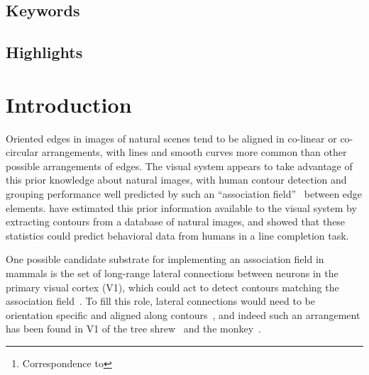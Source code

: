 \documentclass{article}%
\title{\Title}%
\author{\AuthorA \thanks{Correspondence to \Email}}%
\affil{\AddressA}
\author{\AuthorB }
\affil{\AddressB}
\date{}
\begin{document}
%
\maketitle%
{\bf %
\begin{quote}
%
\Abstract
\end{quote}
}%
%
\subsection*{Keywords}%
\Keywords%
%
\subsection*{Highlights}%
\noindent\Highlights %
\section*{Introduction}%
Oriented edges in images of natural scenes tend to be aligned in co-linear or co-circular arrangements, 
with lines and smooth curves more common than other possible arrangements of edges. 
The visual system appears to take advantage of this prior knowledge about natural images, 
with human contour detection and grouping performance well predicted 
by such an ``association field''~\citep{Field93} between edge elements. 
\citet{Geisler01} have estimated this prior information available
to the visual system by extracting contours from a database of natural
images, and showed that these statistics could predict behavioral data
from humans in a line completion task.

One possible candidate substrate for implementing an association field in mammals is
the set of long-range lateral connections between neurons in the primary visual cortex (V1), 
which could act to detect contours matching the association field~\citep{Hunt11}. %
To fill this role, lateral connections would need to be orientation specific 
and aligned along contours~\citep{Hess03}, and
indeed such an arrangement has been found in V1
of the tree shrew~\citep{Bosking97,Hunt11} and the
monkey~\citep{Sincich01}. 
\end{document}
